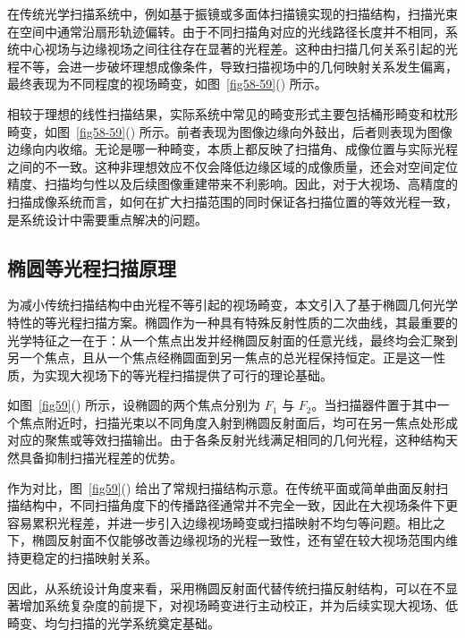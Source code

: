 在传统光学扫描系统中，例如基于振镜或多面体扫描镜实现的扫描结构，扫描光束在空间中通常沿扇形轨迹偏转。由于不同扫描角对应的光线路径长度并不相同，系统中心视场与边缘视场之间往往存在显著的光程差。这种由扫描几何关系引起的光程不等，会进一步破坏理想成像条件，导致扫描视场中的几何映射关系发生偏离，最终表现为不同程度的视场畸变，如图~\ref{fig58-59}() 所示。

相较于理想的线性扫描结果，实际系统中常见的畸变形式主要包括桶形畸变和枕形畸变，如图~\ref{fig58-59}() 所示。前者表现为图像边缘向外鼓出，后者则表现为图像边缘向内收缩。无论是哪一种畸变，本质上都反映了扫描角、成像位置与实际光程之间的不一致。这种非理想效应不仅会降低边缘区域的成像质量，还会对空间定位精度、扫描均匀性以及后续图像重建带来不利影响。因此，对于大视场、高精度的扫描成像系统而言，如何在扩大扫描范围的同时保证各扫描位置的等效光程一致，是系统设计中需要重点解决的问题。


\subsection{椭圆等光程扫描原理}\label{6.2.2}

为减小传统扫描结构中由光程不等引起的视场畸变，本文引入了基于椭圆几何光学特性的等光程扫描方案。椭圆作为一种具有特殊反射性质的二次曲线，其最重要的光学特征之一在于：从一个焦点出发并经椭圆反射面的任意光线，最终均会汇聚到另一个焦点，且从一个焦点经椭圆面到另一焦点的总光程保持恒定。正是这一性质，为实现大视场下的等光程扫描提供了可行的理论基础。

如图~\ref{fig59}() 所示，设椭圆的两个焦点分别为 $F_1$ 与 $F_2$。当扫描器件置于其中一个焦点附近时，扫描光束以不同角度入射到椭圆反射面后，均可在另一焦点处形成对应的聚焦或等效扫描输出。由于各条反射光线满足相同的几何光程，这种结构天然具备抑制扫描光程差的优势。

作为对比，图~\ref{fig59}() 给出了常规扫描结构示意。在传统平面或简单曲面反射扫描结构中，不同扫描角度下的传播路径通常并不完全一致，因此在大视场条件下更容易累积光程差，并进一步引入边缘视场畸变或扫描映射不均匀等问题。相比之下，椭圆反射面不仅能够改善边缘视场的光程一致性，还有望在较大视场范围内维持更稳定的扫描映射关系。

因此，从系统设计角度来看，采用椭圆反射面代替传统扫描反射结构，可以在不显著增加系统复杂度的前提下，对视场畸变进行主动校正，并为后续实现大视场、低畸变、均匀扫描的光学系统奠定基础。

